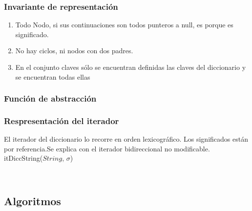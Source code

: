 \subsubsection*{Invariante de representación}


\begin{enumerate}
\item Todo Nodo, si sus continuaciones son todos punteros a null, es porque es significado.
\item No hay ciclos, ni nodos con dos padres.
\item En el conjunto claves sólo se encuentran definidas las claves del diccionario y se encuentran todas ellas
\end{enumerate}

\subsubsection*{Función de abstracción}



						
\subsubsection*{Respresentación del iterador}

  El iterador del diccionario lo recorre en orden lexicográfico. Los significados están por referencia.Se explica con el iterador bidireccional no modificable.
itDiccString($String$, $\sigma$)

  

  ~




\subsection{Algoritmos}
